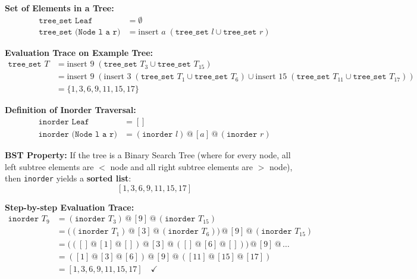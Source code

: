 \documentclass[10pt,a4paper]{article}
\begin{document}
\begin{tcolorbox}[title={2. Primitive Recursive Functions: \texttt{tree\_set}}]
\textbf{Set of Elements in a Tree:}
\begin{align*}
\texttt{tree\_set Leaf} &= \emptyset \\
\texttt{tree\_set (Node l a r)} &= \text{insert } a \; (\texttt{tree\_set } l \cup \texttt{tree\_set } r)
\end{align*}

\textbf{Evaluation Trace on Example Tree:}
\begin{align*}
\texttt{tree\_set } T &= \text{insert } 9 \; (\texttt{tree\_set } T_3 \cup \texttt{tree\_set } T_{15}) \\
&= \text{insert } 9 \; (\text{insert } 3 \; (\texttt{tree\_set } T_1 \cup \texttt{tree\_set } T_6) \cup \text{insert } 15 \; (\texttt{tree\_set } T_{11} \cup \texttt{tree\_set } T_{17})) \\
&= \{1, 3, 6, 9, 11, 15, 17\}
\end{align*}
\end{tcolorbox}

\vspace{0.3em}

\begin{tcolorbox}[title={3. Inorder Traversal of Trees}]
\textbf{Definition of Inorder Traversal:}
\begin{align*}
\texttt{inorder Leaf} &= [] \\
\texttt{inorder (Node l a r)} &= (\texttt{inorder } l) \mathbin{@} [a] \mathbin{@} (\texttt{inorder } r)
\end{align*}

\textbf{BST Property:} If the tree is a Binary Search Tree (where for every node, all left subtree elements are $<$ node and all right subtree elements are $>$ node), then \texttt{inorder} yields a \textbf{sorted list}:
\[ [1, 3, 6, 9, 11, 15, 17] \]

\textbf{Step-by-step Evaluation Trace:}
\begin{align*}
\texttt{inorder } T_9 &= (\texttt{inorder } T_3) \mathbin{@} [9] \mathbin{@} (\texttt{inorder } T_{15}) \\
&= \big((\texttt{inorder } T_1) \mathbin{@} [3] \mathbin{@} (\texttt{inorder } T_6)\big) \mathbin{@} [9] \mathbin{@} (\texttt{inorder } T_{15}) \\
&= \big(([] \mathbin{@} [1] \mathbin{@} []) \mathbin{@} [3] \mathbin{@} ([] \mathbin{@} [6] \mathbin{@} [])\big) \mathbin{@} [9] \mathbin{@} \dots \\
&= ([1] \mathbin{@} [3] \mathbin{@} [6]) \mathbin{@} [9] \mathbin{@} ([11] \mathbin{@} [15] \mathbin{@} [17]) \\
&= [1, 3, 6, 9, 11, 15, 17] \quad \checkmark
\end{align*}
\end{tcolorbox}
\end{document}
